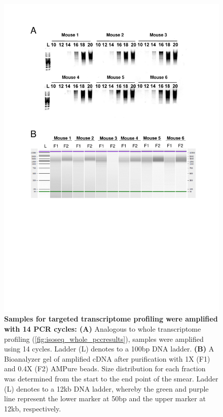 \begin{figure}[htp]
	\centering
	\vspace{20pt}
	\includegraphics[page=1,trim={0 10cm 0 0cm},clip,scale = 0.75]{Figures/TargetedTranscriptome_LabResults.pdf}
	\captionsetup{width=0.95\textwidth}
	\caption[Iso-Seq Targeted Transcriptome - cDNA amplification and purification]%
	{\textbf{Samples for targeted transcriptome profiling were amplified with 14 PCR cycles: (A)} Analogous to whole transcriptome profiling (\cref{fig:isoseq_whole_pccresults}), samples were amplified using 14 cycles. Ladder (L) denotes to a 100bp DNA ladder. \textbf{(B)} A Bioanalyzer gel of amplified cDNA after purification with 1X (F1) and 0.4X (F2) AMPure beads. Size distribution for each fraction was determined from the start to the end point of the smear. Ladder (L) denotes to a 12kb DNA ladder, whereby the green and purple line represent the lower marker at 50bp and the upper marker at 12kb, respectively.}
	\label{fig:isoseq_targeted_pccresults}
\end{figure}


